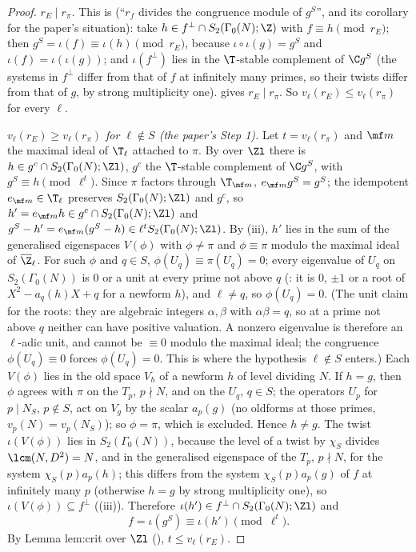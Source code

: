\begin{proof}
\emph{$r_E\mid r_\pi$.} This is  (``$r_f$ divides the congruence module of $g^S$'', and its corollary for the paper's situation): take $h\in f^\perp\cap S_2(\Gamma_0(N);\Z)$ with $f\equiv h\pmod{r_E}$; then
$g^S=\iota(f)\equiv\iota(h)\pmod{r_E}$, because $\iota\circ\iota(g)=g^S$ and $\iota(f)=\iota(\iota(g))$; and $\iota(f^\perp)$ lies in the $\T$-stable complement of $\C g^S$ (the systems in $f^\perp$ differ from that of $f$ at infinitely many
primes, so their twists differ from that of $g$, by strong multiplicity one).  gives $r_E\mid r_\pi$. So $v_\ell(r_E)\le v_\ell(r_\pi)$ for every $\ell$.

\emph{$v_\ell(r_E)\ge v_\ell(r_\pi)$ for $\ell\notin S$ (the paper's Step 1).} Let $t=v_\ell(r_\pi)$ and $\mf m$ the maximal ideal of $\T_\ell$ attached to $\pi$. By  over $\Zl$ there is
$h\in g^c\cap S_2(\Gamma_0(N);\Zl)$, $g^c$ the $\T$-stable complement of $\C g^S$, with $g^S\equiv h\pmod{\ell^t}$. Since $\pi$ factors through $\T_{\mf m}$, $e_{\mf m}g^S=g^S$; the idempotent $e_{\mf m}\in\T_\ell$ preserves
$S_2(\Gamma_0(N);\Zl)$ and $g^c$, so $h'=e_{\mf m}h\in g^c\cap S_2(\Gamma_0(N);\Zl)$ and $g^S-h'=e_{\mf m}(g^S-h)\in\ell^tS_2(\Gamma_0(N);\Zl)$. By (iii), $h'$ lies in the sum of the generalised
eigenspaces $V(\phi)$ with $\phi\ne\pi$ and $\phi\equiv\pi$ modulo the maximal ideal of $\overline\Z_\ell$. For such $\phi$ and $q\in S$, $\phi(U_q)\equiv\pi(U_q)=0$; every eigenvalue of $U_q$ on $S_2(\Gamma_0(N))$ is $0$ or a unit at every
prime not above $q$ (: it is $0$, $\pm1$ or a root of $X^2-a_q(h)X+q$ for a newform $h$), and $\ell\ne q$, so $\phi(U_q)=0$. (The unit claim for the roots: they are
algebraic integers $\alpha,\beta$ with $\alpha\beta=q$, so at a prime not above $q$ neither can have positive valuation. A nonzero eigenvalue is therefore an $\ell$-adic unit, and cannot be
$\equiv0$ modulo the maximal ideal; the congruence $\phi(U_q)\equiv0$ forces $\phi(U_q)=0$. This is where the hypothesis $\ell\notin S$ enters.) Each $V(\phi)$ lies in the old space $V_h$ of a newform $h$ of level dividing $N$.
If $h=g$, then $\phi$ agrees with $\pi$ on the $T_p$, $p\nmid N$, and on the $U_q$, $q\in S$; the operators $U_p$ for $p\mid N_S$, $p\notin S$, act on $V_g$ by the scalar $a_p(g)$ (no oldforms at those primes,
$v_p(N)=v_p(N_S)$); so $\phi=\pi$, which is excluded. Hence $h\ne g$. The twist $\iota(V(\phi))$ lies in $S_2(\Gamma_0(N))$, because the level of a twist by $\chi_S$ divides $\lcm(N,D^2)=N$, and in the generalised
eigenspace of the $T_p$, $p\nmid N$, for the system $\chi_S(p)a_p(h)$; this differs from the system $\chi_S(p)a_p(g)$ of $f$ at infinitely many $p$ (otherwise $h=g$ by strong multiplicity one), so
$\iota(V(\phi))\subseteq f^\perp$ ((iii)). Therefore $\iota(h')\in f^\perp\cap S_2(\Gamma_0(N);\Zl)$ and
\[
f=\iota(g^S)\equiv\iota(h')\pmod{\ell^t}.
\]
By Lemma lem:crit over $\Zl$ (), $t\le v_\ell(r_E)$.
\end{proof}

